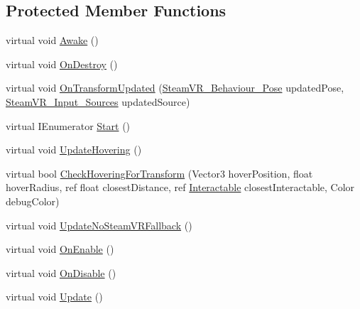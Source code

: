 \subsection*{Protected Member Functions}
\begin{DoxyCompactItemize}
\item 
virtual void \mbox{\hyperlink{class_valve_1_1_v_r_1_1_interaction_system_1_1_hand_abe0894861fa946c40c4d22508043e2e8}{Awake}} ()
\item 
virtual void \mbox{\hyperlink{class_valve_1_1_v_r_1_1_interaction_system_1_1_hand_a05d74f1aa9338a92eff2e22eef5c7f51}{On\+Destroy}} ()
\item 
virtual void \mbox{\hyperlink{class_valve_1_1_v_r_1_1_interaction_system_1_1_hand_ad4f26820b32f5aada5ad753844351ece}{On\+Transform\+Updated}} (\mbox{\hyperlink{class_valve_1_1_v_r_1_1_steam_v_r___behaviour___pose}{Steam\+V\+R\+\_\+\+Behaviour\+\_\+\+Pose}} updated\+Pose, \mbox{\hyperlink{namespace_valve_1_1_v_r_a82e5bf501cc3aa155444ee3f0662853f}{Steam\+V\+R\+\_\+\+Input\+\_\+\+Sources}} updated\+Source)
\item 
virtual I\+Enumerator \mbox{\hyperlink{class_valve_1_1_v_r_1_1_interaction_system_1_1_hand_ab033ec68d0f24fd69df60110e1b5296b}{Start}} ()
\item 
virtual void \mbox{\hyperlink{class_valve_1_1_v_r_1_1_interaction_system_1_1_hand_af2d137dfdef76e617733048b47daa86d}{Update\+Hovering}} ()
\item 
virtual bool \mbox{\hyperlink{class_valve_1_1_v_r_1_1_interaction_system_1_1_hand_ac17817bbf5f05013c7bda03762588c2e}{Check\+Hovering\+For\+Transform}} (Vector3 hover\+Position, float hover\+Radius, ref float closest\+Distance, ref \mbox{\hyperlink{class_valve_1_1_v_r_1_1_interaction_system_1_1_interactable}{Interactable}} closest\+Interactable, Color debug\+Color)
\item 
virtual void \mbox{\hyperlink{class_valve_1_1_v_r_1_1_interaction_system_1_1_hand_aff74350cd7c236e0f35ba21d6509bfe3}{Update\+No\+Steam\+V\+R\+Fallback}} ()
\item 
virtual void \mbox{\hyperlink{class_valve_1_1_v_r_1_1_interaction_system_1_1_hand_ac96d89ed36b00b1128b28fa37cc43bc8}{On\+Enable}} ()
\item 
virtual void \mbox{\hyperlink{class_valve_1_1_v_r_1_1_interaction_system_1_1_hand_a954775ba0b9c02058f9585dc437aebfb}{On\+Disable}} ()
\item 
virtual void \mbox{\hyperlink{class_valve_1_1_v_r_1_1_interaction_system_1_1_hand_a9fe442f7401b9842986d8b484b6a085c}{Update}} ()

\end{DoxyCompactItemize}

